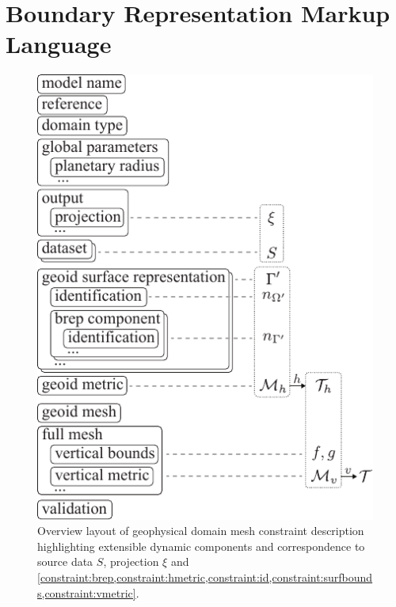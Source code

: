 \documentclass[a4paper, 10pt]{book}
\begin{document}
\chapter{Boundary Representation Markup Language}
\label{sec:brml}
%
\begin{figure}[!h]
\begin{center}
\includegraphics[width=0.6\columnwidth]{fig/block.pdf}
\end{center}
\caption{%
Overview layout of 
geophysical domain mesh
constraint description
highlighting extensible dynamic components
and correspondence to
source data $S$, projection $\xi$ and
\cref{constraint:brep,constraint:hmetric,constraint:id,constraint:surfbounds,constraint:vmetric}.
}
\label{fig:block}
\end{figure}
%
\end{document}
